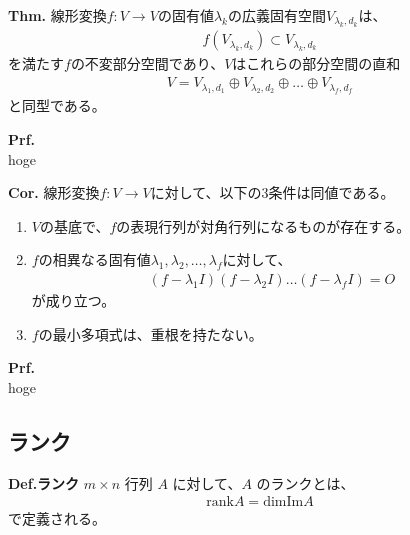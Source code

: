 \documentclass[a4paper,11pt]{jsarticle}
\numberwithin{equation}{section}
\begin{document}
\begin{itembox}[l]{\textbf{Thm.}}
    線形変換$f: V \to V$の固有値$\lambda_k$の広義固有空間$V_{\lambda_k,d_k}$は、
    \begin{align}
        f(V_{\lambda_k,d_k}) \subset V_{\lambda_k,d_k}
    \end{align}
    を満たす$f$の不変部分空間であり、$V$はこれらの部分空間の直和
    \begin{align}
        V = V_{\lambda_1,d_1} \oplus V_{\lambda_2,d_2} \oplus \dots \oplus V_{\lambda_f,d_f}
    \end{align}
    と同型である。
\end{itembox}
\textbf{Prf.}\\
hoge\hfill\qedsymbol\\

\begin{itembox}[l]{\textbf{Cor.}}
  線形変換$f: V \to V$に対して、以下の3条件は同値である。
  \begin{enumerate}
    \item $V$の基底で、$f$の表現行列が対角行列になるものが存在する。
    \item $f$の相異なる固有値$\lambda_1, \lambda_2, \dots, \lambda_f$に対して、
    \begin{align}
      (f-\lambda_1I)(f-\lambda_2I)\dots(f-\lambda_fI) = O
    \end{align}
    が成り立つ。
    \item $f$の最小多項式は、重根を持たない。
    \end{enumerate}
\end{itembox}
\textbf{Prf.}\\
hoge\hfill\qedsymbol\\




\subsection{ランク}
\begin{itembox}[l]{\textbf{Def.ランク}}
    $m \times n$ 行列 $A$ に対して、$A$ のランクとは、
    \begin{align}
        \text{rank} A = \text{dim} \text{Im} A
    \end{align}
    で定義される。
\end{itembox}
 
\end{document}
